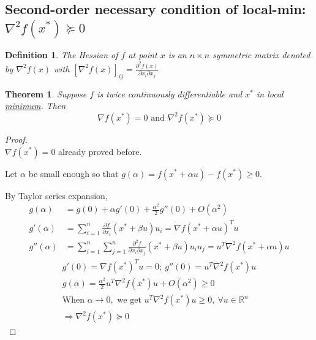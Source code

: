 \documentclass[11pt,a4paper]{article}
\newtheorem{theorem}{Theorem}
\newtheorem{definition}{Definition}
\begin{document}
\subsection*{Second-order necessary condition of local-min: $\nabla^2 f(x^*)\succeq 0$}
\begin{definition}
The Hessian of $f$ at point $x$ is an $n\times n$ symmetric matrix denoted by $\nabla^2 f(x)$ with $[\nabla^2 f(x)]_{ij}=\frac{\partial^2 f(x)}{\partial x_i\partial x_j}$
\end{definition}
\begin{theorem}
Suppose $f$ is twice continuously differentiable and $x^*$ in local \underline{minimum}. Then $$\nabla f(x^*)=0\text{ and }\nabla^2 f(x^*)\succeq 0$$
\end{theorem}
\begin{proof}
\quad\\
$\nabla f(x^*)=0$ already proved before.

Let $\alpha$ be small enough so that $g(\alpha)=f(x^*+\alpha u)-f(x^*)\geq 0$.

By Taylor series expansion,
\begin{equation}
    \begin{aligned}
        g(\alpha)&=g(0)+\alpha g'(0)+\frac{\alpha^2}{2}g''(0)+O(\alpha^2)\\
        g'(\alpha)&=\sum_{i=1}^n \frac{\partial f}{\partial x_i}(x^*+\beta u)u_i=\nabla f(x^*+\alpha u)^T u\\
        g''(\alpha)&=\sum_{i=1}^n\sum_{j=1}^n \frac{\partial^2 f}{\partial x_i\partial x_j}(x^*+\beta u)u_iu_j=u^T\nabla^2 f(x^*+\alpha u) u
    \end{aligned}
    \nonumber
\end{equation}
\begin{equation}
    \begin{aligned}
        g'(0)=\nabla f(x^*)^T u=0;\ g''(0)=u^T\nabla^2 f(x^*) u\\
        g(\alpha)=\frac{\alpha^2}{2}u^T\nabla^2 f(x^*) u+O(\alpha^2)\geq 0\\
        \text{When }\alpha \rightarrow 0,\text{ we get } u^T\nabla^2 f(x^*) u\geq 0,\ \forall u\in \mathbb{R}^n\\
        \Rightarrow	\nabla^2 f(x^*)\succeq 0
    \end{aligned}
    \nonumber
\end{equation}
\end{proof}
\end{document}
